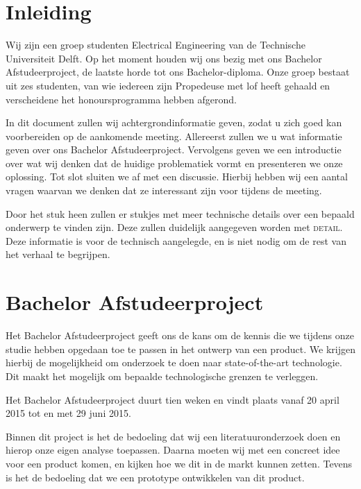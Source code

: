 \documentclass[oneside, a4paper, openany]{memoir}
\begin{document}


\frontmatter
\setcounter{page}{5}
\begin{titlingpage}
  \pagestyle{empty}
  \titleGM
\end{titlingpage}

\tableofcontents

\clearpage
\mainmatter

\chapter{Inleiding}
Wij zijn een groep studenten Electrical Engineering van de Technische Universiteit Delft. Op het moment houden wij ons bezig met ons Bachelor Afstudeerproject, de laatste horde tot ons Bachelor-diploma. Onze groep bestaat uit zes studenten, van wie iedereen zijn Propedeuse met lof heeft gehaald en verscheidene het honoursprogramma hebben afgerond.

In dit document zullen wij achtergrondinformatie geven, zodat u zich goed kan voorbereiden op de aankomende meeting. Allereerst zullen  we u wat informatie geven over ons Bachelor Afstudeerproject. Vervolgens geven we een introductie over wat wij denken dat de huidige problematiek vormt en presenteren we onze oplossing. Tot slot sluiten we af met een discussie. Hierbij hebben wij een aantal vragen waarvan we denken dat ze interessant zijn voor tijdens de meeting.

Door het stuk heen zullen er stukjes met meer technische details over een bepaald onderwerp te vinden zijn. Deze zullen duidelijk aangegeven worden met \textsc{detail}. Deze informatie is voor de technisch aangelegde, en is niet nodig om de rest van het verhaal te begrijpen.

\chapter{Bachelor Afstudeerproject}
Het Bachelor Afstudeerproject geeft ons de kans om de kennis die we tijdens onze studie hebben opgedaan toe te passen in het ontwerp van een product. We krijgen hierbij de mogelijkheid om onderzoek te doen naar state-of-the-art technologie. Dit maakt het mogelijk om bepaalde technologische grenzen te verleggen.

Het Bachelor Afstudeerproject duurt tien weken en vindt plaats vanaf 20 april 2015 tot en met 29 juni 2015.

Binnen dit project is het de bedoeling dat wij een literatuuronderzoek doen en hierop onze eigen analyse toepassen. Daarna moeten wij met een concreet idee voor een product komen, en kijken hoe we dit in de markt kunnen zetten. Tevens is het de bedoeling dat we een prototype ontwikkelen van dit product.
\end{document}
